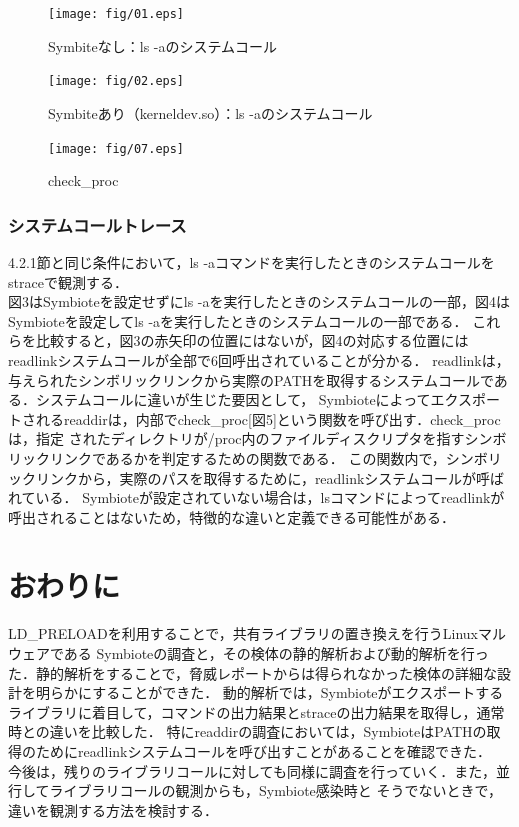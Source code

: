 \documentclass[submit,techreq,noauthor]{eco}	%
\begin{document}
\begin{figure}[t]
	\centering
  \texttt{[image: fig/01.eps]}
	\caption{Symbiteなし：ls -aのシステムコール}
	\label{fig:s-ls}
\end{figure}

\begin{figure}[t]
	\centering
  \texttt{[image: fig/02.eps]}
	\caption{Symbiteあり（kerneldev.so）：ls -aのシステムコール}
	\label{fig:s-ls}
\end{figure}

\begin{figure}[t]
	\centering
  \texttt{[image: fig/07.eps]}
	\caption{check\_proc}
	\label{fig:readdir}
\end{figure}

\subsubsection{システムコールトレース}
4.2.1節と同じ条件において，ls -aコマンドを実行したときのシステムコールをstraceで観測する．\\
図3はSymbioteを設定せずにls -aを実行したときのシステムコールの一部，図4はSymbioteを設定してls -aを実行したときのシステムコールの一部である．
これらを比較すると，図3の赤矢印の位置にはないが，図4の対応する位置にはreadlinkシステムコールが全部で6回呼出されていることが分かる． 
readlinkは，与えられたシンボリックリンクから実際のPATHを取得するシステムコールである．システムコールに違いが生じた要因として，
Symbioteによってエクスポートされるreaddirは，内部でcheck\_proc[図5]という関数を呼び出す．check\_procは，指定
されたディレクトリが/proc内のファイルディスクリプタを指すシンボリックリンクであるかを判定するための関数である．
この関数内で，シンボリックリンクから，実際のパスを取得するために，readlinkシステムコールが呼ばれている．
Symbioteが設定されていない場合は，lsコマンドによってreadlinkが呼出されることはないため，特徴的な違いと定義できる可能性がある．\\




\section{おわりに}
LD\_PRELOADを利用することで，共有ライブラリの置き換えを行うLinuxマルウェアである
Symbioteの調査と，その検体の静的解析および動的解析を行った．静的解析をすることで，脅威レポートからは得られなかった検体の詳細な設計を明らかにすることができた．
動的解析では，Symbioteがエクスポートするライブラリに着目して，コマンドの出力結果とstraceの出力結果を取得し，通常時との違いを比較した．
特にreaddirの調査においては，SymbioteはPATHの取得のためにreadlinkシステムコールを呼び出すことがあることを確認できた．\\
今後は，残りのライブラリコールに対しても同様に調査を行っていく．また，並行してライブラリコールの観測からも，Symbiote感染時と
そうでないときで，違いを観測する方法を検討する．

\setlength\baselineskip{12pt}
{\small
	
	
}
\end{document}
